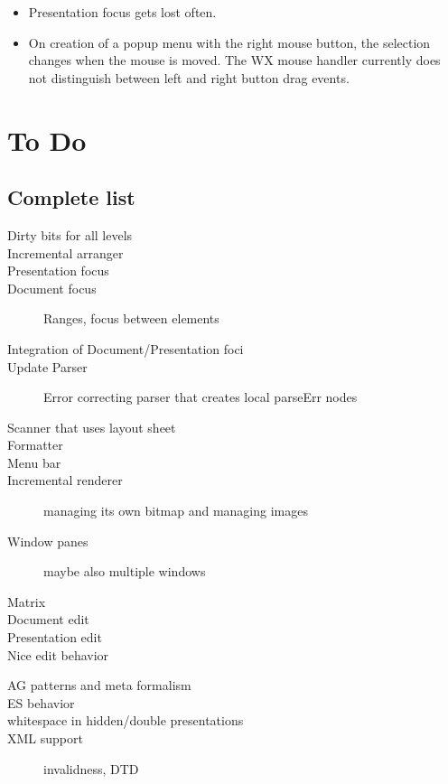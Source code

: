 \documentclass[]{article}
\begin{document}
\begin{itemize}
\item Presentation focus gets lost often.
\item On creation of a popup menu with the right mouse button, the selection changes when the mouse is moved. The WX mouse handler currently does not distinguish between left and right button drag events.
\end{itemize}


\section{To Do}
\subsection{Complete list}
\begin{description}
\item [Dirty bits for all levels]
\item [Incremental arranger]
\item [Presentation focus]
\item [Document focus]Ranges, focus between elements
\item [Integration of Document/Presentation foci]
\item [Update Parser] Error correcting parser that creates local parseErr nodes
\item [Scanner that uses layout sheet] 
\item [Formatter]
\item [Menu bar]
\item [Incremental renderer] managing its own bitmap and managing images
\item [Window panes] maybe also multiple windows
\item [Matrix]
\item [Document edit]
\item [Presentation edit]
\item [Nice edit behavior]
\end{description}

\begin{description}
\item [AG patterns and meta formalism]
\item [ES behavior]
\item [whitespace in hidden/double presentations]
\item [XML support] invalidness, DTD
\end{description}
\end{document}
